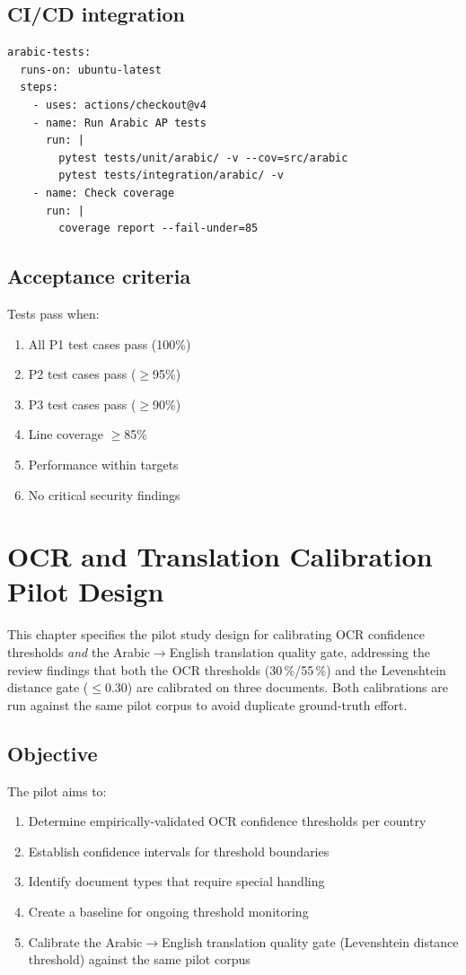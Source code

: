 \documentclass[11pt,a4paper,twoside]{report}
\begin{document}
\section{CI/CD integration}

\begin{lstlisting}[basicstyle=\ttfamily\small,caption={GitHub Actions workflow excerpt.}]
arabic-tests:
  runs-on: ubuntu-latest
  steps:
    - uses: actions/checkout@v4
    - name: Run Arabic AP tests
      run: |
        pytest tests/unit/arabic/ -v --cov=src/arabic
        pytest tests/integration/arabic/ -v
    - name: Check coverage
      run: |
        coverage report --fail-under=85
\end{lstlisting}

\section{Acceptance criteria}

Tests pass when:
\begin{enumerate}
  \item All P1 test cases pass (100\%)
  \item P2 test cases pass ($\geq$95\%)
  \item P3 test cases pass ($\geq$90\%)
  \item Line coverage $\geq$85\%
  \item Performance within targets
  \item No critical security findings
\end{enumerate}\chapter{OCR and Translation Calibration Pilot Design}\label{ch:ocr-pilot}

This chapter specifies the pilot study design for calibrating OCR confidence
thresholds \emph{and} the Arabic$\to$English translation quality gate,
addressing the review findings that both the OCR thresholds (30\,\%/55\,\%)
and the Levenshtein distance gate ($\le$0.30) are calibrated on three
documents. Both calibrations are run against the same pilot corpus to avoid
duplicate ground-truth effort.

\section{Objective}

The pilot aims to:
\begin{enumerate}
  \item Determine empirically-validated OCR confidence thresholds per country
  \item Establish confidence intervals for threshold boundaries
  \item Identify document types that require special handling
  \item Create a baseline for ongoing threshold monitoring
  \item Calibrate the Arabic$\to$English translation quality gate
        (Levenshtein distance threshold) against the same pilot corpus
\end{enumerate}
\end{document}
